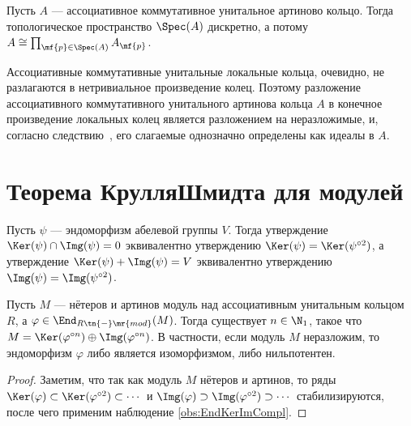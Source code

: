 \documentclass[
	extrafontsizes,
	11pt,
	hyphens,
]{memoir}
\begin{document}
\begin{observation}
Пусть \(A\) --- ассоциативное коммутативное унитальное артиново кольцо.
Тогда топологическое пространство \(\Spec(A)\) дискретно, а потому \(A \cong \prod_{\mf{p} \in \Spec(A)} A_{\mf{p}}\).
\end{observation}

\begin{observation}
Ассоциативные коммутативные унитальные локальные кольца, очевидно, не разлагаются в нетривиальное произведение колец.
Поэтому разложение ассоциативного коммутативного унитального артинова кольца \(A\) в конечное произведение локальных колец является разложением на неразложимые, и, согласно следствию~, его слагаемые однозначно определены как идеалы в \(A\).
\end{observation}


\section{Теорема Крулля\namedash{}Шмидта для модулей}

\begin{observation}
\label{obs:EndKerImCompl}
Пусть \(\psi\) --- эндоморфизм абелевой группы \(V\).
Тогда утверждение \(\Ker(\psi) \cap \Img(\psi) = 0\)
эквивалентно утверждению \(\Ker(\psi) = \Ker(\psi^{\circ 2})\), а утверждение \(\Ker(\psi) + \Img(\psi) = V\) эквивалентно утверждению \(\Img(\psi) = \Img(\psi^{\circ 2})\).
\end{observation}

\begin{lemma}
\label{lem:FittingLemma}
Пусть \(M\) --- нётеров и артинов модуль над ассоциативным унитальным кольцом \(R\),
а \(\varphi \in \End_{R\tn{-}\mr{mod}}(M)\).
Тогда существует \(n \in \N_1\), такое что \(M = \Ker(\varphi^{\circ n}) \oplus \Img(\varphi^{\circ n})\).
В частности, если модуль \(M\) неразложим, то эндоморфизм \(\varphi\) либо является изоморфизмом, либо нильпотентен.
\end{lemma}

\begin{proof}
Заметим, что так как модуль \(M\) нётеров и артинов, то ряды
\(\Ker(\varphi) \subset \Ker(\varphi^{\circ 2}) \subset \cdots{}\)
и
\(\Img(\varphi) \supset \Img(\varphi^{\circ 2}) \supset \cdots{}\)
стабилизируются, после чего применим наблюдение \ref{obs:EndKerImCompl}.
\end{proof}
\end{document}
